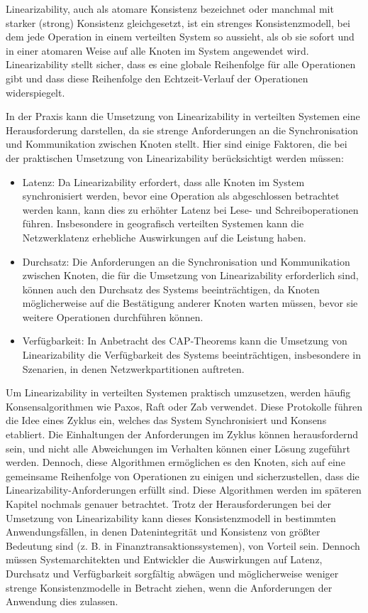 Linearizability, auch als atomare Konsistenz bezeichnet oder manchmal mit starker (strong) Konsistenz gleichgesetzt, ist ein strenges Konsistenzmodell, bei dem jede Operation in einem verteilten System so aussieht, als ob sie sofort und in einer atomaren Weise auf alle Knoten im System angewendet wird. Linearizability stellt sicher, dass es eine globale Reihenfolge für alle Operationen gibt und dass diese Reihenfolge den Echtzeit-Verlauf der Operationen widerspiegelt.

In der Praxis kann die Umsetzung von Linearizability in verteilten Systemen eine Herausforderung darstellen, da sie strenge Anforderungen an die Synchronisation und Kommunikation zwischen Knoten stellt. Hier sind einige Faktoren, die bei der praktischen Umsetzung von Linearizability berücksichtigt werden müssen:

\begin{itemize}
\item Latenz: Da Linearizability erfordert, dass alle Knoten im System synchronisiert werden, bevor eine Operation als abgeschlossen betrachtet werden kann, kann dies zu erhöhter Latenz bei Lese- und Schreiboperationen führen. Insbesondere in geografisch verteilten Systemen kann die Netzwerklatenz erhebliche Auswirkungen auf die Leistung haben.
\item Durchsatz: Die Anforderungen an die Synchronisation und Kommunikation zwischen Knoten, die für die Umsetzung von Linearizability erforderlich sind, können auch den Durchsatz des Systems beeinträchtigen, da Knoten möglicherweise auf die Bestätigung anderer Knoten warten müssen, bevor sie weitere Operationen durchführen können.
\item Verfügbarkeit: In Anbetracht des CAP-Theorems kann die Umsetzung von Linearizability die Verfügbarkeit des Systems beeinträchtigen, insbesondere in Szenarien, in denen Netzwerkpartitionen auftreten.
\end{itemize}
Um Linearizability in verteilten Systemen praktisch umzusetzen, werden häufig Konsensalgorithmen wie Paxos, Raft oder Zab verwendet. Diese Protokolle führen die Idee eines Zyklus ein, welches das System Synchronisiert und Konsens etabliert. Die Einhaltungen der Anforderungen im Zyklus können herausfordernd sein, und nicht alle Abweichungen im Verhalten können einer Lösung zugeführt werden. Dennoch, diese Algorithmen ermöglichen es den Knoten, sich auf eine gemeinsame Reihenfolge von Operationen zu einigen und sicherzustellen, dass die Linearizability-Anforderungen erfüllt sind. Diese Algorithmen werden im späteren Kapitel nochmals genauer betrachtet. Trotz der Herausforderungen bei der Umsetzung von Linearizability kann dieses Konsistenzmodell in bestimmten Anwendungsfällen, in denen Datenintegrität und Konsistenz von größter Bedeutung sind (z. B. in Finanztransaktionssystemen), von Vorteil sein. Dennoch müssen Systemarchitekten und Entwickler die Auswirkungen auf Latenz, Durchsatz und Verfügbarkeit sorgfältig abwägen und möglicherweise weniger strenge Konsistenzmodelle in Betracht ziehen, wenn die Anforderungen der Anwendung dies zulassen.

